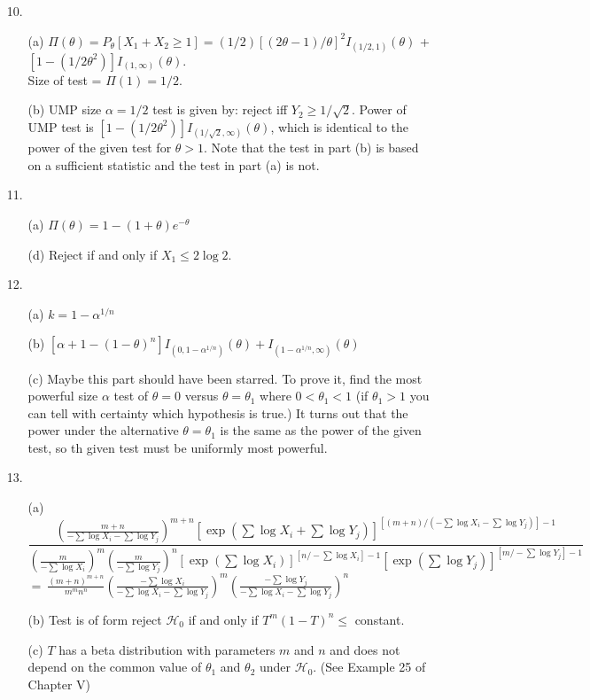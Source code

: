 \begin{enumerate}
  	\item[10.] \begin{enumerate}
  		\item[(a)] $\Pi(\theta) = P_\theta[X_1+X_2\ge 1] = (1/2)[(2\theta-1)/\theta]^2I_{(1/2,1)}(\theta)$ + $[1-(1/2\theta^2)]I_{(1,\infty)}(\theta).$ \\ Size of test = $\Pi(1) = 1/2$.
  		\item[(b)] UMP size $\alpha = 1/2$ test is given by: reject iff $Y_2 \ge 1/\sqrt{2}$. Power of UMP test is $[1-(1/2\theta^2)]I_{(1/\sqrt{2},\infty)}(\theta)$, which is identical to the power of the given test for $\theta>1$. Note that the test in part (b) is based on a sufficient statistic and the test in part (a) is not. 
  	\end{enumerate}
 	
	\item[11.] \begin{enumerate}
		\item[(a)] $\Pi(\theta) = 1 - (1+\theta)e^{-\theta}$
		\item[(d)] Reject if and only if $X_1 \le 2\log 2$.
	\end{enumerate}

	\item[12.] \begin{enumerate}
		\item[(a)] $k = 1 - \alpha^{1/n}$
		\item[(b)] $[\alpha + 1-(1-\theta)^n]I_{(0,1-\alpha^{1/n})}(\theta) + I_{(1-\alpha^{1/n},\infty)}(\theta)$
		\item[(c)] Maybe this part should have been starred. To prove it, find the most powerful size $\alpha$ test of $\theta=0$ versus $\theta=\theta_1$ where $0< \theta_1< 1$ (if $\theta_1>1$ you can tell with certainty which hypothesis is true.) It turns out that the power under the alternative $\theta=\theta_1$ is the same as the power of the given test, so th given test must be uniformly most powerful.
	\end{enumerate}
	
	\newpage
	\item[13.] \begin{enumerate}
		\item[(a)] $\dfrac{\left(\frac{m+n}{-\sum\log X_i - \sum\log Y_j}\right)^{m+n}[\exp(\sum\log X_i + \sum\log Y_j)]^{[(m+n)/(-\sum\log X_i -\sum\log Y_j)]-1}}{\left(\frac{m}{-\sum\log X_i}\right)^m\left(\frac{m}{-\sum\log Y_j}\right)^n[\exp(\sum\log X_i)]^{[n/-\sum\log X_i]-1}[\exp(\sum\log Y_j)]^{[m/-\sum\log Y_j]-1}}$ \\
		$=\ \frac{(m+n)^{m+n}}{m^mn^n}\left(\frac{-\sum\log X_i}{-\sum\log X_i-\sum\log Y_j}\right)^m \left(\frac{-\sum\log Y_j}{-\sum\log X_i-\sum\log Y_j}\right)^n$
		\item[(b)] Test is of form reject $\mathscr{H}_0$ if and only if $T^m(1-T)^n \le$ constant.
		\item[(c)] $T$ has a beta distribution with parameters $m$ and $n$ and does not depend on the common value of $\theta_1$ and $\theta_2$ under $\mathscr{H}_0$. (See Example 25 of Chapter V)
	\end{enumerate}
	

\end{enumerate}
